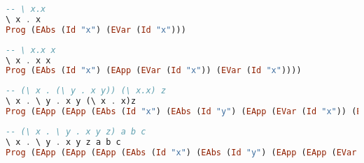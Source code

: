 \documentclass{article}
\theoremstyle{theorem}
\theoremstyle{definition}
\theoremstyle{remark}
\begin{document}
\begin{lstlisting}[language=Haskell]
-- \ x.x
\ x . x
Prog (EAbs (Id "x") (EVar (Id "x")))
\end{lstlisting}

\hfil
{}
\hfil
\newpage
\begin{lstlisting}[language=Haskell]
-- \ x.x x
\ x . x x
Prog (EAbs (Id "x") (EApp (EVar (Id "x")) (EVar (Id "x"))))
\end{lstlisting}

\hfil
{}
\hfil

\begin{lstlisting}[language=Haskell]
-- (\ x . (\ y . x y)) (\ x.x) z
\ x . \ y . x y (\ x . x)z
Prog (EApp (EApp (EAbs (Id "x") (EAbs (Id "y") (EApp (EVar (Id "x")) (EVar (Id "y"))))) (EAbs (Id "x") (EVar (Id "x")))) (EVar (Id "z")))
\end{lstlisting}

\hfil
{}
\hfil

\newpage
\begin{lstlisting}[language=Haskell]
-- (\ x . \ y . x y z) a b c
\ x . \ y . x y z a b c
Prog (EApp (EApp (EApp (EAbs (Id "x") (EAbs (Id "y") (EApp (EApp (EVar (Id "x")) (EVar (Id "y"))) (EVar (Id "z"))))) (EVar (Id "a"))) (EVar (Id "b"))) (EVar (Id "c")))
\end{lstlisting}

\hfil
{}
\hfil
\end{document}
